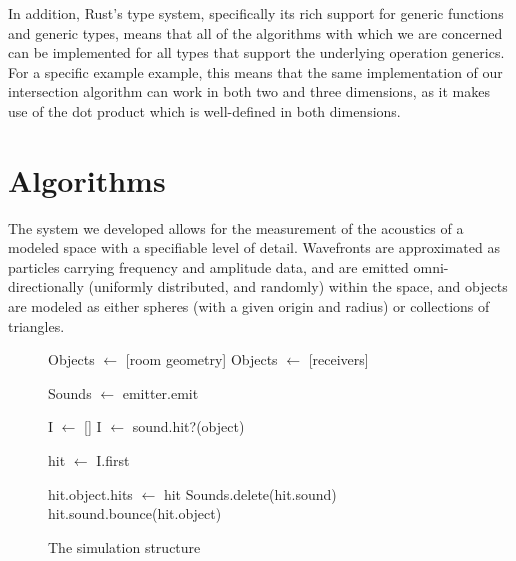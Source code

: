 \documentclass[10pt]{article}
\begin{document}
In addition, Rust's type system, specifically its rich support for generic
functions and generic types, means that all of the algorithms with which we are
concerned can be implemented for all types that support the underlying operation
generics.  For a specific example example, this means that the same
implementation of our intersection algorithm can work in both two and three
dimensions, as it makes use of the dot product which is well-defined in both
dimensions.

\section{Algorithms}

The system we developed allows for the measurement of the acoustics of a modeled
space with a specifiable level of detail.  Wavefronts are approximated as
particles carrying frequency and amplitude data, and are emitted
omni-directionally (uniformly distributed, and randomly) within the space, and
objects are modeled as either spheres (with a given origin and radius) or
collections of triangles.

\begin{figure}
  \begin{minipage}{0.5\textwidth}
    \begin{algorithm}[H]
      \caption{The simulation structure}
      \label{simalg}
      \scriptsize
      \begin{algorithmic}
        \STATE Objects $\gets$ [room geometry]
        \STATE Objects $\gets$ [receivers]

        \STATE Sounds $\gets$ emitter.emit
        \ENDFOR

        \REPEAT

        \STATE I $\gets$ []
        \STATE I $\gets$ sound.hit?(object)
        \ENDFOR

        \STATE hit $\gets$ I.first

        \STATE hit.object.hits $\gets$ hit
        \STATE Sounds.delete(hit.sound)
        \ELSE
        \STATE hit.sound.bounce(hit.object)
        \ENDIF

        \ENDFOR

      \end{algorithmic}
    \end{algorithm}
  \end{minipage}
\end{figure}
\end{document}
